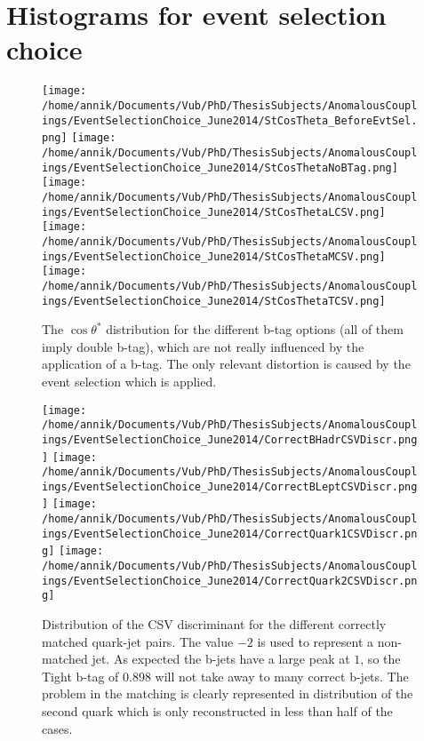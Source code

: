 \section{Histograms for event selection choice}
\begin{center}

\begin{figure}[!h]
 \texttt{[image: /home/annik/Documents/Vub/PhD/ThesisSubjects/AnomalousCouplings/EventSelectionChoice\_June2014/StCosTheta\_BeforeEvtSel.png]}
\texttt{[image: /home/annik/Documents/Vub/PhD/ThesisSubjects/AnomalousCouplings/EventSelectionChoice\_June2014/StCosThetaNoBTag.png]}
\texttt{[image: /home/annik/Documents/Vub/PhD/ThesisSubjects/AnomalousCouplings/EventSelectionChoice\_June2014/StCosThetaLCSV.png]}
\texttt{[image: /home/annik/Documents/Vub/PhD/ThesisSubjects/AnomalousCouplings/EventSelectionChoice\_June2014/StCosThetaMCSV.png]}
\texttt{[image: /home/annik/Documents/Vub/PhD/ThesisSubjects/AnomalousCouplings/EventSelectionChoice\_June2014/StCosThetaTCSV.png]}
\caption{The $\cos \theta^{*}$ distribution for the different b-tag options (all of them imply double b-tag), which are not really influenced by the application of a b-tag. The only relevant distortion is caused by the event selection which is applied.}
\end{figure}

\begin{figure}[!h]
 \texttt{[image: /home/annik/Documents/Vub/PhD/ThesisSubjects/AnomalousCouplings/EventSelectionChoice\_June2014/CorrectBHadrCSVDiscr.png]}
\texttt{[image: /home/annik/Documents/Vub/PhD/ThesisSubjects/AnomalousCouplings/EventSelectionChoice\_June2014/CorrectBLeptCSVDiscr.png]}
\texttt{[image: /home/annik/Documents/Vub/PhD/ThesisSubjects/AnomalousCouplings/EventSelectionChoice\_June2014/CorrectQuark1CSVDiscr.png]}
\texttt{[image: /home/annik/Documents/Vub/PhD/ThesisSubjects/AnomalousCouplings/EventSelectionChoice\_June2014/CorrectQuark2CSVDiscr.png]}
\caption{Distribution of the CSV discriminant for the different correctly matched quark-jet pairs. The value $-2$ is used to represent a non-matched jet. As expected the b-jets have a large peak at $1$, so the Tight b-tag of 0.898 will not take away to many correct b-jets. The problem in the matching is clearly represented in distribution of the second quark which is only reconstructed in less than half of the cases.}
\end{figure}


\end{center}
